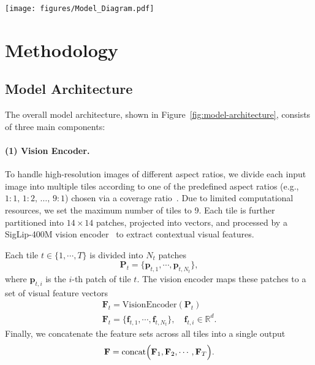 \begin{figure*}[t!]
    \centering
    \texttt{[image: figures/Model\_Diagram.pdf]}
    \caption{\textbf{\ourmodel{} Model Architecture.} The vision encoder extracts image features, which are processed to produce probabilities over the LLM embeddings. A weighted average combines these probabilities with embeddings to generate vision input vectors. Text inputs are tokenized, and the corresponding embeddings are selected from the embedding matrix, which is then used as input to the LLM. We display the vision layers in \colorbox{align_blue}{blue}, and the text layers in \colorbox{align_pink}{purple}.}
    \label{fig:model-architecture}
\end{figure*}

\section{Methodology}

\subsection{Model Architecture}\label{sec:architecture}
The overall model architecture, shown in Figure~\ref{fig:model-architecture}, consists of three main components:
\paragraph{(1) Vision Encoder.}\label{sec:vision-encoder}
To handle high-resolution images of different aspect ratios, we divide each input image into multiple tiles according to one of the predefined aspect ratios (e.g., $1{:}1,\,1{:}2,\,\dots,\,9{:}1$) chosen via a coverage ratio~\citep{ovis, chen2024fargpt4vclosinggap}. Due to limited computational resources, we set the maximum number of tiles to 9. Each tile is further partitioned into $14\times 14$ patches, projected into vectors, and processed by a SigLip-400M vision encoder~\citep{zhai2023sigmoidlosslanguageimage} to extract contextual visual features.

Each tile $t \in \{1,\cdots,T\}$ is divided into $N_t$ patches
\begin{equation}
\mathbf{P}_t = \{\mathbf{p}_{t,1}, \cdots, \mathbf{p}_{t,N_t}\},\nonumber
\end{equation}
where $\mathbf{p}_{t,i}$ is the $i$-th patch of tile $t$. The vision encoder maps these patches to a set of visual feature vectors
\begin{gather}
\mathbf{F}_t = \mathrm{VisionEncoder}(\mathbf{P}_t) \nonumber \\
\mathbf{F}_t = \{\mathbf{f}_{t,1}, \cdots, \mathbf{f}_{t,N_t}\},
\quad
\mathbf{f}_{t,i} \in \mathbb{R}^d.\nonumber
\end{gather}
Finally, we concatenate the feature sets across all tiles into a single output
\begin{equation}
\mathbf{F} = \mathrm{concat}\Bigl(\mathbf{F}_1, \mathbf{F}_2, \cdots, \mathbf{F}_T\Bigr).\nonumber
\end{equation}





